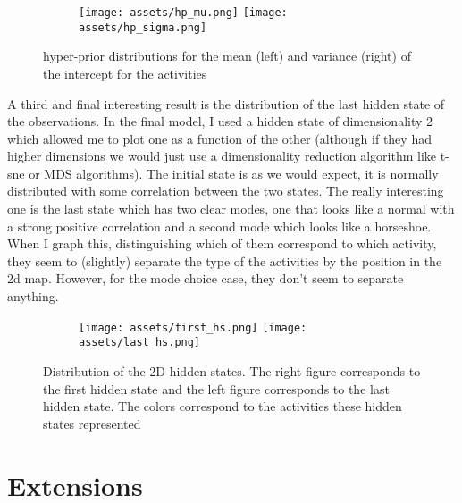 \documentclass{article}
\begin{document}
\begin{figure}[H]
    \centering
    \begin{subfigure}[b]{\textwidth}
        \texttt{[image: assets/hp\_mu.png]}\hfill
        \texttt{[image: assets/hp\_sigma.png]}\hfill
    \end{subfigure}
    \caption{hyper-prior distributions for the mean (left) and variance (right) of the intercept for the activities}
    \label{fig:hp}
\end{figure}

A third and final interesting result is the distribution of the last hidden state of the observations. In the final model, I used a hidden state of dimensionality 2 which allowed me to plot one as a function of the other (although if they had higher dimensions we would just use a dimensionality reduction algorithm like t-sne or MDS algorithms). The initial state is as we would expect, it is normally distributed with some correlation between the two states. The really interesting one is the last state which has two clear modes, one that looks like a normal with a strong positive correlation and a second mode which looks like a horseshoe. When I graph this, distinguishing which of them correspond to which activity, they seem to (slightly) separate the type of the activities by the position in the 2d map. However, for the mode choice case, they don't seem to separate anything. 

\begin{figure}[H]
    \centering
    \begin{subfigure}[b]{\textwidth}
        \texttt{[image: assets/first\_hs.png]}\hfill
        \texttt{[image: assets/last\_hs.png]}\hfill
    \end{subfigure}
    \caption{Distribution of the 2D hidden states. The right figure corresponds to the first hidden state and the left figure corresponds to the last hidden state. The colors correspond to the activities these hidden states represented}
    \label{fig:hs}
\end{figure}

\section{Extensions}
\end{document}
